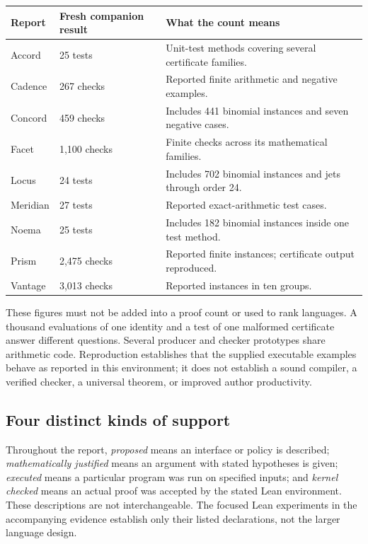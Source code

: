 \documentclass[11pt,letterpaper]{article}
\begin{document}
\begin{center}\small
\begin{tabularx}{\textwidth}{@{}P{.9in}P{1.5in}Y@{}}
\toprule
Report & Fresh companion result & What the count means\\
\midrule
Accord & 25 tests & Unit-test methods covering several certificate families.\\
Cadence & 267 checks & Reported finite arithmetic and negative examples.\\
Concord & 459 checks & Includes 441 binomial instances and seven negative cases.\\
Facet & 1,100 checks & Finite checks across its mathematical families.\\
Locus & 24 tests & Includes 702 binomial instances and jets through order 24.\\
Meridian & 27 tests & Reported exact-arithmetic test cases.\\
Noema & 25 tests & Includes 182 binomial instances inside one test method.\\
Prism & 2,475 checks & Reported finite instances; certificate output reproduced.\\
Vantage & 3,013 checks & Reported instances in ten groups.\\
\bottomrule
\end{tabularx}
\end{center}

These figures must not be added into a proof count or used to rank languages.
A thousand evaluations of one identity and a test of one malformed certificate
answer different questions. Several producer and checker prototypes share
arithmetic code. Reproduction establishes that the supplied executable examples
behave as reported in this environment; it does not establish a sound compiler,
a verified checker, a universal theorem, or improved author productivity.

\subsection{Four distinct kinds of support}
Throughout the report, \emph{proposed} means an interface or policy is described;
\emph{mathematically justified} means an argument with stated hypotheses is
given; \emph{executed} means a particular program was run on specified inputs;
and \emph{kernel checked} means an actual proof was accepted by the stated Lean
environment. These descriptions are not interchangeable. The focused Lean
experiments in the accompanying evidence establish only their
listed declarations, not the larger language design.
\end{document}

